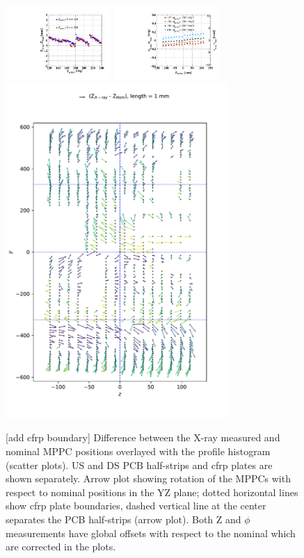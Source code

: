 \begin{figure}
\includegraphics[width=4cm]{plots/dz_boardrotation.pdf}
\includegraphics[width=4cm]{plots/dphi_boardrotation.pdf}\\
\includegraphics[width=8.5cm]{plots/dzdy2017_rx.pdf}
\caption{[add cfrp boundary]
Difference between the X-ray measured and nominal MPPC positions
overlayed with the profile histogram (scatter plots).
US and DS PCB half-strips and cfrp plates are shown separately.
Arrow plot showing rotation of the MPPCs with respect to nominal
positions in the YZ plane; dotted horizontal lines show cfrp plate boundaries,
dashed vertical line at the center separates the PCB half-strips (arrow plot).
Both Z and $\phi$ measurements have global offsets with respect to the 
nominal which are corrected in the plots.
}
\label{fig:rotation}
\end{figure}


